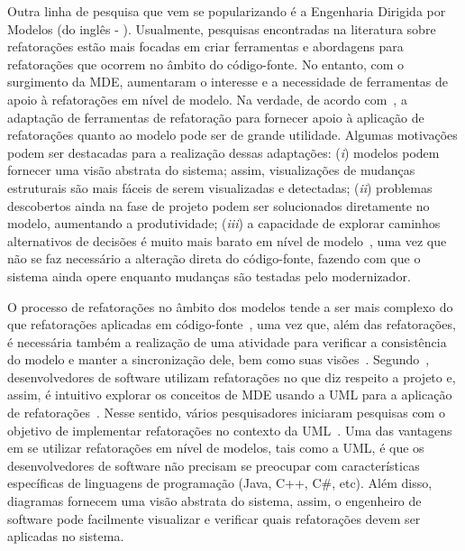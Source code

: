 Outra linha de pesquisa que vem se popularizando é a Engenharia Dirigida por Modelos (do inglês - ). 
Usualmente, pesquisas encontradas na literatura sobre refatorações estão mais focadas em criar ferramentas e abordagens para refatorações que ocorrem no âmbito do código-fonte. 
No entanto, com o surgimento da MDE, aumentaram o interesse e a necessidade de ferramentas de apoio à refatorações em nível de modelo. Na verdade, de acordo com~, a adaptação de ferramentas de refatoração para fornecer apoio à aplicação de refatorações quanto ao modelo pode ser de grande utilidade. Algumas motivações podem ser destacadas para a realização dessas adaptações: (\emph{i}) modelos podem fornecer uma visão abstrata do sistema; assim, visualizações de mudanças estruturais são mais fáceis de serem visualizadas e detectadas; (\emph{ii}) problemas descobertos ainda na fase de projeto podem ser solucionados diretamente no modelo, aumentando a produtividade; (\emph{iii}) a capacidade de explorar caminhos alternativos de decisões é muito mais barato em nível de modelo~\cite{Mens_2006}, uma vez que não se faz necessário a alteração direta do código-fonte, fazendo com que o sistema ainda opere enquanto mudanças são testadas pelo modernizador.


O processo de refatorações no âmbito dos modelos tende a ser mais complexo do que refatorações aplicadas em código-fonte~\cite{Mens_2006}, uma vez que, além das refatorações, é necessária também a realização de uma atividade para verificar a consistência do modelo e manter a sincronização dele, bem como suas visões~\cite{KolahdouzRahimi20145}. Segundo~, desenvolvedores de software utilizam refatorações no que diz respeito a projeto e, assim, é intuitivo explorar os conceitos de MDE usando a UML para a aplicação de refatorações~\cite{Salem_2008, Gorp, Egyed_2008, Briand_2006, staron2004implementing}. Nesse sentido, vários pesquisadores iniciaram pesquisas com o objetivo de implementar refatorações no contexto da UML~\cite{revisao_sistematica_uml_refactoring}. Uma das vantagens em se utilizar refatorações em nível de modelos, tais como a UML, é que os desenvolvedores de software não precisam se preocupar com características específicas de linguagens de programação (Java, C++, C\#, etc). Além disso, diagramas fornecem uma visão abstrata do sistema, assim, o engenheiro de software pode facilmente visualizar e verificar quais refatorações devem ser aplicadas no sistema. 

